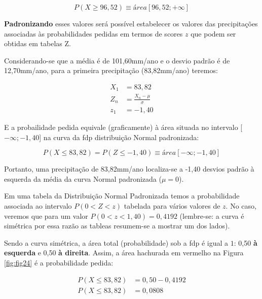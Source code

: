 \documentclass[
]{book}
\begin{document}
\[
P(X \ge 96,52) \equiv área[96,52 ; +\infty]
\]

\hfill\break

\textbf{Padronizando} esses valores será possível estabelecer os valores das precipitações associadas às probabilidades pedidas em termos de scores \(z\) que podem ser obtidas em tabelas Z.

\hfill\break

Considerando-se que a média é de 101,60mm/ano e o desvio padrão é de 12,70mm/ano, para a primeira precipitação (83,82mm/ano) teremos:

\begin{align*}
X_{1} & = 83,82 \\
Z_{n} & =  \frac{X_{n} - \mu}{\sigma}\\
z_{1} & = -1,40
\end{align*}

\hfill\break

E a probailidade pedida equivale (graficamente) à área situada no intervalo {[}\(-\infty ; -1,40\){]} na curva da fdp distribuição Normal padronizada:

\hfill\break

\[
P(X \le 83,82) = P(Z \le -1,40) \equiv área[-\infty ; -1,40]
\]

\hfill\break

Portanto, uma precipitação de 83,82mm/ano localiza-se a -1,40 desvios padrão à esquerda da média da curva Normal padronizada (\(\mu=0\)).

\hfill\break

Em uma tabela da Distribuição Normal Padronizada temos a probabilidade associada ao intervalo \(P(0<Z<z)\) tabelada para vários valores de \(z\). No caso, veremos que para um valor \(P(0<z<1,40)=0,4192\) (lembre-se: a curva é simétrica por essa razão as tableas resumem-se a mostrar um dos lados).

\hfill\break

Sendo a curva simétrica, a área total (probabilidade) sob a fdp é igual a \(1\): 0,50 \textbf{à esquerda} e 0,50 \textbf{à direita}. Assim, a área hachurada em vermelho na Figura \ref{fig:fig24} é a probabilidade pedida:

\hfill\break

\begin{align*}
P(X \le 83,82) & = 0,50 - 0,4192 \\
P(X \le 83,82) & =  0,0808
\end{align*}

\hfill\break
\end{document}
